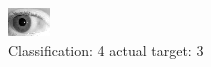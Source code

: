 \begin{figure}[h!]
\begin{center}
\includegraphics[width=0.60\columnwidth]{figures/ID294_class_4_target_3.png}
\end{center}
\caption{ Classification: 4 actual target: 3}
\label{fig:ID294_class_4_target_3}
\end{figure}
